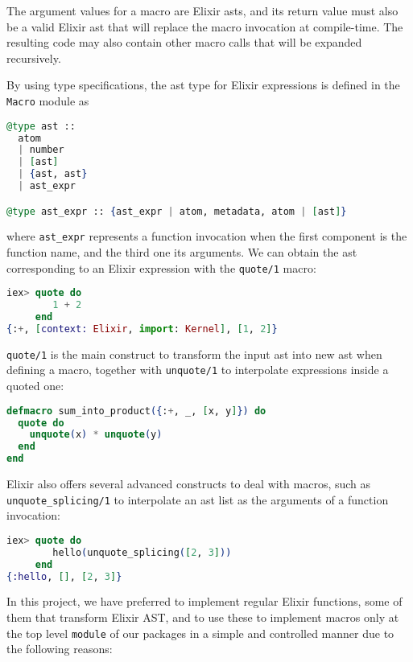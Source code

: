 The argument values for a macro are Elixir \gls{ast}s, and its return value must
also be a valid Elixir \gls{ast} that will replace the macro invocation at
compile-time. The resulting code may also contain other macro calls that will be
expanded recursively.

By using type specifications, the \gls{ast} type for Elixir expressions is
defined in the \verb|Macro| module as

\begin{lstlisting}[language=elixir,numbers=none,frame=none]
@type ast ::
  atom
  | number
  | [ast]
  | {ast, ast}
  | ast_expr

@type ast_expr :: {ast_expr | atom, metadata, atom | [ast]}
\end{lstlisting}

where \verb|ast_expr| represents a function invocation when the first component
is the function name, and the third one its arguments. We can obtain the
\gls{ast} corresponding to an Elixir expression with the \verb|quote/1| macro:

\begin{lstlisting}[language=elixir,numbers=none,frame=none]
iex> quote do 
        1 + 2
     end
{:+, [context: Elixir, import: Kernel], [1, 2]}
\end{lstlisting}

\verb|quote/1| is the main construct to transform the input \gls{ast} into new
\gls{ast} when defining a macro, together with \verb|unquote/1| to interpolate
expressions inside a quoted one:

\begin{lstlisting}[language=elixir,numbers=none,frame=none]
defmacro sum_into_product({:+, _, [x, y]}) do
  quote do
    unquote(x) * unquote(y)
  end
end
\end{lstlisting}

Elixir also offers several advanced constructs to deal with macros, such as
\verb|unquote_splicing/1| to interpolate an \gls{ast} list as the arguments of a
function invocation:

\begin{lstlisting}[language=elixir,numbers=none,frame=none]
iex> quote do
        hello(unquote_splicing([2, 3]))
     end
{:hello, [], [2, 3]}
\end{lstlisting}

In this project, we have preferred to implement regular Elixir functions, some 
of them that transform Elixir AST, and to use these to implement macros only at
the top level \verb|module| of our packages in a simple and controlled manner
due to the following reasons:

